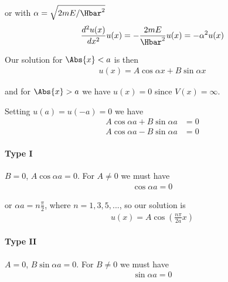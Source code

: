 {or with \(\alpha = \sqrt{2m E/\Hbar^2}\)
%
\begin{equation}\label{eqn:PHY356Lecture9:7}
\begin{aligned}
\frac{d^2 u(x)}{dx^2} u(x) = -\frac{2 m E}{\Hbar^2} u(x) = - \alpha^2 u(x)
\end{aligned}
\end{equation}

Our solution for \(\Abs{x} < a\) is then
%
\begin{equation}\label{eqn:PHY356Lecture9:8}
\begin{aligned}
u(x) = A \cos \alpha x + B \sin\alpha x
\end{aligned}
\end{equation}

and for \(\Abs{x} > a\) we have \(u(x) = 0\) since \(V(x) = \infty\).

Setting \(u(a) = u(-a) = 0\) we have
\begin{equation}\label{eqn:lecture9boundStates:100}
\begin{aligned}
A \cos \alpha a + B \sin\alpha a &= 0 \\
A \cos \alpha a - B \sin\alpha a &= 0
\end{aligned}
\end{equation}


\paragraph{Type I}
\(B=0\), \(A \cos\alpha a = 0\).  For \(A \ne 0\) we must have
%
\begin{equation}\label{eqn:lecture9boundStates:120}
\begin{aligned}
\cos \alpha a = 0
\end{aligned}
\end{equation}

or \(\alpha a = n \frac{\pi}{2}\), where \(n = 1, 3, 5, ...\), so our solution is
%
\begin{equation}\label{eqn:PHY356Lecture9:9}
\begin{aligned}
u(x) = A \cos \left( \frac{n \pi}{2 a} x \right)
\end{aligned}
\end{equation}

\paragraph{Type II}
\(A=0\), \(B \sin\alpha a = 0\).  For \(B \ne 0\) we must have
%
\begin{equation}\label{eqn:lecture9boundStates:140}
\begin{aligned}
\sin \alpha a = 0
\end{aligned}
\end{equation}

}
